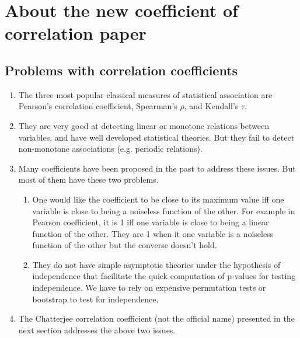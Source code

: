 \chapter{About the new coefficient of correlation paper}

\section{Problems with correlation coefficients}
\begin{enumerate}
    \item The three most popular classical measures of statistical association are Pearson's correlation coefficient, Spearman's $\rho$, and Kendall's $\tau$.
    \item They are very good at detecting linear or monotone relations between variables, and  have well developed statistical theories. But they fail to detect non-monotone associations (e.g. periodic relations).
    \item Many coefficients have been proposed in the past to address these issues. But most of them have these two problems.

    \begin{enumerate}
        \item One would like the coefficient to be close to its maximum value iff one variable is close to being a noiseless function of the other. For example in Pearson coefficient, it is 1 iff one variable is close to being a linear function of the other. They are 1 when it one variable is a noiseless function of the other but the converse doesn't hold.
        \item They do not have simple asymptotic theories under the hypothesis of independence that facilitate the quick computation of p-values for testing independence. We have to rely on expensive permutation tests or bootstrap to test for independence.
    \end{enumerate}
    \item The Chatterjee correlation coefficient (not the official name) presented in the next section addresses the above two issues.
\end{enumerate}

